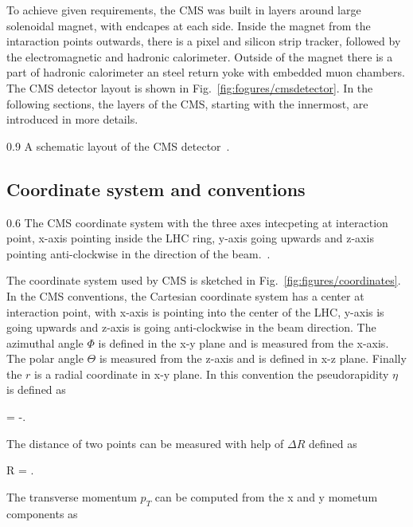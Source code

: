 To achieve given requirements, the CMS was built in layers around large solenoidal magnet, with endcapes at each side. Inside the magnet from the intaraction points outwards, there is a pixel and silicon strip tracker, followed by the electromagnetic and hadronic calorimeter. Outside of the magnet there is a part of hadronic calorimeter an steel return yoke with embedded muon chambers. The CMS detector layout is shown in Fig.~\ref{fig:fogures/cmsdetector}. In the following sections, the layers of the CMS, starting with the innermost, are introduced in more details.


                 {0.9}       %
                 { A schematic layout of the CMS detector~\cite{website:CMSdet}. }

\subsection{Coordinate system and conventions}

                 {0.6}       %
                 { The CMS coordinate system with the three axes intecpeting at interaction point, x-axis pointing inside the LHC ring, y-axis going upwards and z-axis pointing anti-clockwise in the direction of the beam.~\cite{Pantaleo:2293435}. }

The coordinate system used by CMS is sketched in Fig.~\ref{fig:figures/coordinates}. In the CMS conventions, the Cartesian coordinate system has a center at interaction point, with x-axis is pointing into the center of the LHC, y-axis is going upwards and z-axis is going anti-clockwise in the beam direction. The azimuthal angle $\Phi$ is defined in the x-y plane and is measured from the x-axis. The polar angle $\Theta$ is measured from the z-axis and is defined in x-z plane. Finally the $r$ is a radial coordinate in x-y plane. In this convention the pseudorapidity $\eta$ is defined as

{
    \eta =  -.
}

The distance of two points can be measured with help of $\Delta R$ defined as

{
    \Delta R = .
}


The transverse momentum $p_{T}$ can be computed from the x and y mometum components as

